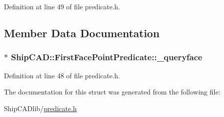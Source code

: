 Definition at line 49 of file predicate.\+h.



\subsection{Member Data Documentation}
\subsubsection[{\texorpdfstring{\+\_\+queryface}{_queryface}}]{$\ast$ Ship\+C\+A\+D\+::\+First\+Face\+Point\+Predicate\+::\+\_\+queryface}\hypertarget{structShipCAD_1_1FirstFacePointPredicate_a29ecdce23916a74f8378a893e1b0cdac}{}\label{structShipCAD_1_1FirstFacePointPredicate_a29ecdce23916a74f8378a893e1b0cdac}


Definition at line 48 of file predicate.\+h.



The documentation for this struct was generated from the following file\+:\begin{DoxyCompactItemize}
\item 
Ship\+C\+A\+Dlib/\hyperlink{predicate_8h}{predicate.\+h}\end{DoxyCompactItemize}
